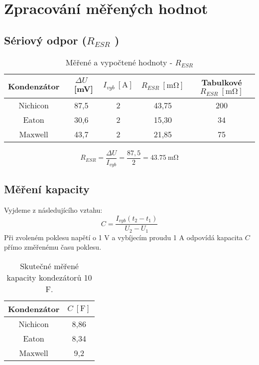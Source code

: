 \documentclass{protokol}
\begin{document}

\section{Zpracování měřených hodnot}	
\subsection{Sériový odpor (\(R_{ESR} \) )}
\begin{table}[h!]
	\centering
	\def\arraystretch{1.4}
	\begin{tabular}{|c|c|c|c|c|}
		\hline
		Kondenzátor & \(\Delta U\)\ [\unit{\milli\volt}]  & \(I_{vyb}\ [\unit{\ampere}] \)  & \(R_{ESR}\ [\unit{\milli\ohm}] \)  & Tabulkové \(R_{ESR}\ [\unit{\milli\ohm}] \)  \\ \hline \hline
		Nichicon  & 87,5                                         & 2                           & 43,75                      & 200                                   \\ \hline
		Eaton      & 30,6                                         & 2                           & 15,30                      & 34                                    \\ \hline
		Maxwell       & 43,7                                         & 2                           & 21,85                      & 75                                    \\ \hline
	\end{tabular}
	\caption{Měřené a vypočtené hodnoty - \(R_{ESR} \) }
	\label{tab:ojjoij}
\end{table}

\[
	R_{ESR} = \frac{\Delta U}{I_{vyb} } = \frac{87,5}{2}=\qty{43,75}{\milli\ohm}
\]

\subsection{Měření kapacity}
Vyjdeme z následujícího vztahu:
\[
	C=\frac{I_{vyb} (t_{2} -t_{1} )}{U_{2} -U_{1} }
\]
Při zvoleném poklesu napětí o 1 V a vybíjecím proudu 1 A odpovídá kapacita \(C\)  přímo změřenému času poklesu. 

\begin{table}[h!]
	\centering
	\def\arraystretch{1.4}
	\begin{tabular}{|c|c|}
		\hline
		Kondenzátor & \(C\ [\unit{\farad}] \)  \\ \hline \hline
		Nichicon  & 8,86 \\ \hline
		Eaton     & 8,34 \\ \hline
		Maxwell   & 9,2 \\ \hline
	\end{tabular}
	\caption{Skutečné měřené kapacity kondezátorů 10 F. }
	\label{tab:ojjoij}
\end{table}
\end{document}
